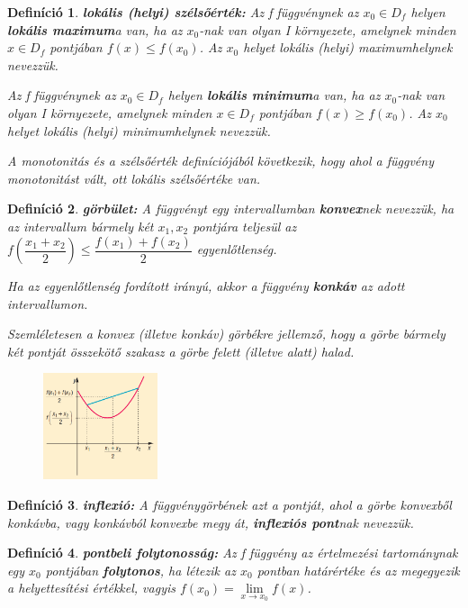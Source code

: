 \documentclass[12pt,a4paper]{article}
\newtheorem{definition}{Definíció} [section]
\begin{document}
\begin{definition}
\textbf{lokális (helyi) szélsőérték:} Az f függvénynek az $x_0 \in D_f$ helyen \textbf{lokális maximum}a van, ha az $x_0$-nak van olyan I környezete, amelynek minden $x \in D_f$ pontjában $f(x) \leq f(x_0)$. Az $x_0$ helyet lokális (helyi) maximumhelynek nevezzük.

Az f függvénynek az $x_0 \in D_f$ helyen \textbf{lokális minimum}a van, ha az $x_0$-nak van olyan I környezete, amelynek minden $x \in D_f$ pontjában $f(x) \geq f(x_0)$. Az $x_0$ helyet lokális (helyi) minimumhelynek nevezzük.

A monotonitás és a szélsőérték definíciójából következik, hogy ahol a függvény monotonitást vált, ott lokális szélsőértéke van.
\end{definition}
\newpage
\begin{definition}
\textbf{görbület:} A függvényt egy intervallumban \textbf{konvex}nek nevezzük, ha az intervallum bármely két $x_1, x_2$ pontjára teljesül az $f\left(\dfrac{x_1+x_2}{2}\right) \leq \dfrac{f(x_1)+f(x_2)}{2} $ egyenlőtlenség.

Ha az egyenlőtlenség fordított irányú, akkor a függvény \textbf{konkáv} az adott intervallumon.

Szemléletesen a konvex (illetve konkáv) görbékre jellemző, hogy a görbe bármely két pontját összekötő szakasz a görbe felett (illetve alatt) halad.
\begin{figure}[h]
\centering
\includegraphics[width=0.3\textwidth]{konvexitas_def}
\end{figure}
\end{definition}

\begin{definition}
\textbf{inflexió:} A függvénygörbének azt a pontját, ahol a görbe konvexből konkávba, vagy konkávból konvexbe megy át, \textbf{inflexiós pont}nak nevezzük.
\end{definition}

\begin{definition}
\textbf{pontbeli folytonosság:} Az f függvény az értelmezési tartománynak egy $x_0$ pontjában \textbf{folytonos}, ha létezik az $x_0$ pontban határértéke és az megegyezik a helyettesítési értékkel, vagyis $f(x_0)=\lim\limits_{x \rightarrow x_0} f(x)$.
\end{definition}
\end{document}
